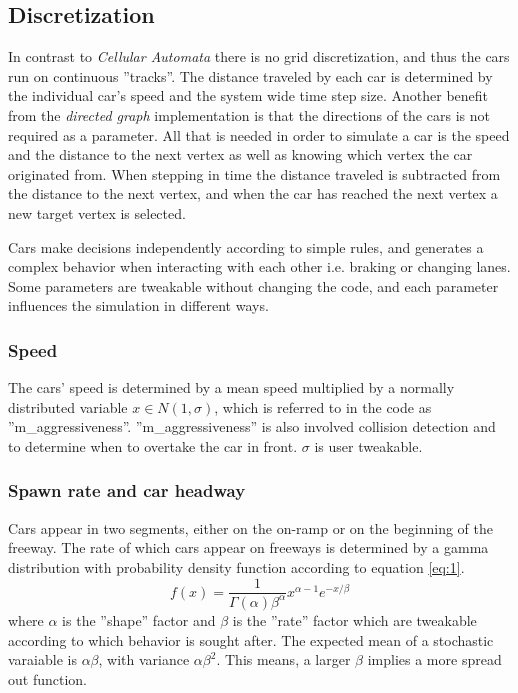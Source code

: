 \documentclass{article}
\begin{document}
  \subsection{Discretization}
    In contrast to \textit{Cellular Automata}
    there is no grid discretization, and thus the cars run on continuous ''tracks''.
    The distance traveled by each car is determined by the individual car's speed and
    the system wide time step size.
    Another benefit from the \textit{directed graph} implementation is that
    the directions of the cars is not required as a parameter. All that is needed in
    order to simulate a car is the speed and the distance
    to the next vertex as well as knowing which vertex the car originated from.
    When stepping in time the distance traveled is subtracted from the distance to the next vertex, and
    when the car has reached the next vertex a new target vertex is selected.

    Cars make decisions independently according to simple rules, and generates
    a complex behavior when interacting with each other i.e. braking or changing lanes.
    Some parameters are tweakable without changing the code, and each parameter
    influences the simulation in different ways.
    \subsubsection{Speed}
      The cars' speed is determined by a mean speed multiplied by a normally distributed
      variable $x \in N(1,\sigma)$, which is referred to in the code as
      ''m\_aggressiveness''. ''m\_aggressiveness'' is also involved collision detection
      and to determine when to overtake the car in front. $\sigma$ is user tweakable.
    \subsubsection{Spawn rate and car headway}
      Cars appear in two segments, either on the on-ramp or on the beginning of the freeway.
      The rate of
      which cars appear on freeways is determined by a gamma distribution
      with probability density function according to equation \ref{eq:1}. \cite{abdel-rahim_ce571:_nodate}
      \begin{equation}
        f(x) = \frac{1}{\Gamma(\alpha)\beta^{\alpha}}x^{\alpha-1}e^{-x/\beta}
        \label{eq:1}
      \end{equation}
      where $\alpha$ is the ''shape'' factor and $\beta$ is the ''rate'' factor which are
      tweakable according to which behavior is sought after. The expected mean of a
      stochastic varaiable is $\alpha\beta$, with variance $\alpha\beta^{2}$.
      This means, a larger $\beta$ implies a more spread out function.
\end{document}
